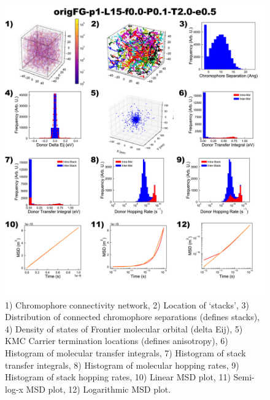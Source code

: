 \documentclass[12pt]{article}
\begin{document}
\begin{figure}[h]\centering
	\includegraphics[width=\textwidth]{Figures/origFG-p1-L15-f0.0-P0.1-T2.0-e0.5.png}
    \caption{   1) Chromophore connectivity network, 
                2) Location of `stacks', 
                3) Distribution of connected chromophore separations (defines stacks),
                4) Density of states of Frontier molecular orbital (delta Eij),
                5) KMC Carrier termination locations (defines anisotropy),
                6) Histogram of molecular transfer integrals,
                7) Histogram of stack transfer integrals,
                8) Histogram of molecular hopping rates,
                9) Histogram of stack hopping rates,
                10) Linear MSD plot,
                11) Semi-log-x MSD plot,
                12) Logarithmic MSD plot.}
	\label{fig:UneqlT2.0}
\end{figure}
\end{document}
